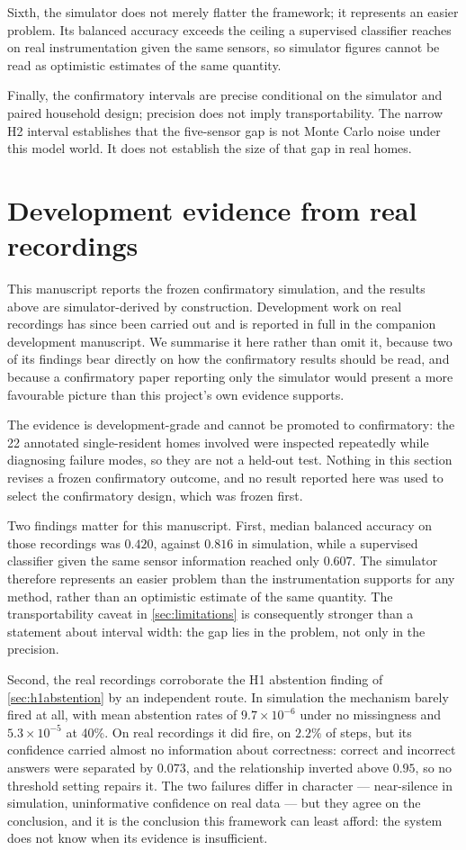 \documentclass[11pt]{article}
\begin{document}
Sixth, the simulator does not merely flatter the framework; it represents an easier problem. Its balanced accuracy exceeds the ceiling a supervised classifier reaches on real instrumentation given the same sensors, so simulator figures cannot be read as optimistic estimates of the same quantity.

Finally, the confirmatory intervals are precise conditional on the simulator and paired household design; precision does not imply transportability. The narrow H2 interval establishes that the five-sensor gap is not Monte Carlo noise under this model world. It does not establish the size of that gap in real homes.

\section{Development evidence from real recordings}
\label{sec:realdev}

This manuscript reports the frozen confirmatory simulation, and the results
above are simulator-derived by construction. Development work on real
recordings has since been carried out and is reported in full in the companion
development manuscript. We summarise it here rather than omit it, because two of
its findings bear directly on how the confirmatory results should be read, and
because a confirmatory paper reporting only the simulator would present a more
favourable picture than this project's own evidence supports.

The evidence is development-grade and cannot be promoted to confirmatory: the 22
annotated single-resident homes involved were inspected repeatedly while
diagnosing failure modes, so they are not a held-out test. Nothing in this
section revises a frozen confirmatory outcome, and no result reported here was
used to select the confirmatory design, which was frozen first.

Two findings matter for this manuscript. First, median balanced accuracy on
those recordings was $0.420$, against $0.816$ in simulation, while a supervised
classifier given the same sensor information reached only $0.607$. The simulator
therefore represents an easier problem than the instrumentation supports for any
method, rather than an optimistic estimate of the same quantity. The
transportability caveat in \cref{sec:limitations} is consequently stronger than a
statement about interval width: the gap lies in the problem, not only in the
precision.

Second, the real recordings corroborate the H1 abstention finding of
\cref{sec:h1abstention} by an independent route. In simulation the mechanism
barely fired at all, with mean abstention rates of $9.7\times10^{-6}$ under no
missingness and $5.3\times10^{-5}$ at 40\%. On real recordings it did fire, on
$2.2\%$ of steps, but its confidence carried almost no information about
correctness: correct and incorrect answers were separated by $0.073$, and the
relationship inverted above $0.95$, so no threshold setting repairs it. The two
failures differ in character --- near-silence in simulation, uninformative
confidence on real data --- but they agree on the conclusion, and it is the
conclusion this framework can least afford: the system does not know when its
evidence is insufficient.
\end{document}
